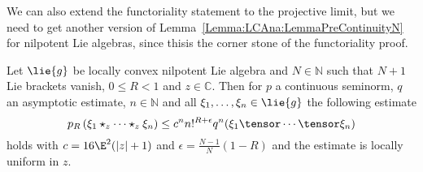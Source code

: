 We can also extend the functoriality statement to the projective limit, but we 
need to get another version of Lemma~\ref{Lemma:LCAna:LemmaPreContinuityN} for 
nilpotent Lie algebras, since thisis the corner stone of the functoriality 
proof.
\begin{lemma}
    \label{Lemma:Nilpot:LemmaPreContinuityN}%
    Let $\lie{g}$ be locally convex nilpotent Lie algebra and $N \in 
    \mathbb{N}$ such that $N + 1$ Lie brackets vanish, $0 \leq R < 1$ and 
    $z \in \mathbb{C}$. Then for $p$ a continuous seminorm, $q$ an
    asymptotic estimate, $n \in \mathbb{N}$ and all $\xi_1, \ldots,
    \xi_n \in \lie{g}$ the following estimate
    \begin{equation}
        \label{Nilpot:LemmaPreContinuityN}
        p_R \left(
            \xi_1 \star_z \cdots \star_z \xi_n
        \right)
        \leq
        c^n n!^{R + \epsilon}
        q^n(\xi_1 \tensor \cdots \tensor \xi_n)
    \end{equation}
    holds with $c = 16 \E^2 (|z| + 1)$ and $\epsilon = \frac{N-1}{N}(1 - R)$
    and the estimate is locally uniform in $z$.
\end{lemma}
